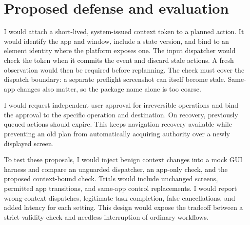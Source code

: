 \documentclass[10pt,a4paper,twoside]{article}
\begin{document}
\section{Proposed defense and evaluation}
I would attach a short-lived, system-issued context token to a planned action. It would identify the app and window, include a state version, and bind to an element identity where the platform exposes one. The input dispatcher would check the token when it commits the event and discard stale actions. A fresh observation would then be required before replanning. The check must cover the dispatch boundary: a separate preflight screenshot can itself become stale. Same-app changes also matter, so the package name alone is too coarse.

I would request independent user approval for irreversible operations and bind the approval to the specific operation and destination. On recovery, previously queued actions should expire. This keeps navigation recovery available while preventing an old plan from automatically acquiring authority over a newly displayed screen.

To test these proposals, I would inject benign context changes into a mock GUI harness and compare an unguarded dispatcher, an app-only check, and the proposed context-bound check. Trials would include unchanged screens, permitted app transitions, and same-app control replacements. I would report wrong-context dispatches, legitimate task completion, false cancellations, and added latency for each setting. This design would expose the tradeoff between a strict validity check and needless interruption of ordinary workflows.

\begingroup
\setlength{\bibsep}{1pt}
\renewcommand{\bibfont}{\footnotesize}


\endgroup
\end{document}

